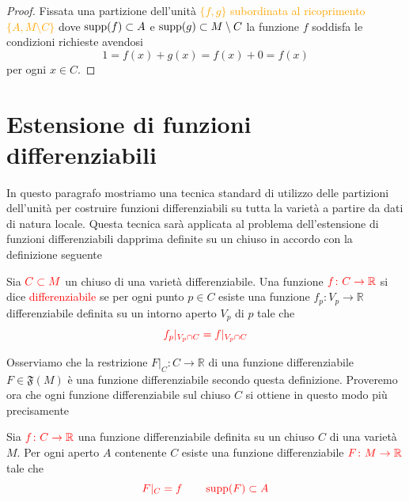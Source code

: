         \begin{proof}
        Fissata una partizione dell'unità \textcolor{orange}{$\{f, g\}$ subordinata al ricoprimento $\{A, M \setminus C\}$} dove $\operatorname{supp}(f) \subset A$ e $\operatorname{supp}(g) \subset M \setminus C$ la funzione $f$ soddisfa le condizioni richieste avendosi
        \[
        1 = f(x) + g(x) = f(x) + 0 = f(x)
        \]
        per ogni $x \in C$.
        \end{proof}

    \section{Estensione di funzioni differenziabili}

        In questo paragrafo mostriamo una tecnica standard di utilizzo delle partizioni dell'unità per costruire funzioni differenziabili su tutta la varietà a partire da dati di natura locale. Questa tecnica sarà applicata al problema dell'estensione di funzioni differenziabili dapprima definite su un chiuso in accordo con la definizione seguente

        \begin{definizione}
        \label{def:funzione_differenziabile_su_chiuso}
        \mbox{}

        Sia $\textcolor{red}{C \subset M}$ un chiuso di una varietà differenziabile. Una funzione $\textcolor{red}{f \colon C \to \mathbb{R}}$ si dice \textcolor{red}{differenziabile} se per ogni punto $p \in C$ esiste una funzione $f_p \colon V_p \to \mathbb{R}$ differenziabile definita su un intorno aperto $V_p$ di $p$ tale che
        \[
        \textcolor{red}{f_p|_{V_p \cap C} = f|_{V_p \cap C}}
        \]
        \end{definizione}

        Osserviamo che la restrizione $F|_C \colon C \to \mathbb{R}$ di una funzione differenziabile $F \in \mathfrak{F}(M)$ è una funzione differenziabile secondo questa definizione. Proveremo ora che ogni funzione differenziabile sul chiuso $C$ si ottiene in questo modo più precisamente

        \begin{teorema}
        \label{th:estensione_funzioni_differenziabili_chiuso}
        \mbox{}

        Sia $\textcolor{red}{f \colon C \to \mathbb{R}}$ una funzione differenziabile definita su un chiuso $C$ di una varietà $M$. Per ogni aperto $A$ contenente $C$ esiste una funzione differenziabile $\textcolor{red}{F \colon M \to \mathbb{R}}$ tale che
        \[
        \textcolor{red}{F|_C = f \qquad \operatorname{supp}(F) \subset A}
        \]
        \end{teorema}

